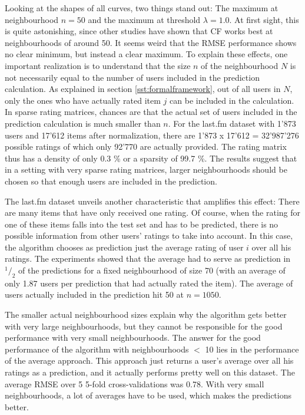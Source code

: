 Looking at the shapes of all curves, two things stand out: The maximum at neighbourhood $n=50$ and the maximum at threshold $\lambda = 1.0$. At first sight, this is quite astonishing, since other studies have shown that CF works best at neighbourhoods of around 50. It seems weird that the RMSE performance shows no clear minimum, but instead a clear maximum. To explain these effects, one important realization is to understand that the size $n$ of the neighbourhood $N$ is not necessarily equal to the number of users included in the prediction calculation. As explained in section \ref{sst:formalframework}, out of all users in $N$, only the ones who have actually rated item $j$ can be included in the calculation. In sparse rating matrices, chances are that the actual set of users included in the prediction calculation is much smaller than $n$. For the last.fm dataset with 1'873 users and 17'612 items after normalization, there are 1'873 x 17'612 = 32'987'276 possible ratings of which only 92'770 are actually provided. The rating matrix thus has a density of only 0.3 \% or a sparsity of 99.7 \%. The results suggest that in a setting with very sparse rating matrices, larger neighbourhoods should be chosen so that enough users are included in the prediction.

The last.fm dataset unveils another characteristic that amplifies this effect: There are many items that have only received one rating. Of course, when the rating for one of these items falls into the test set and has to be predicted, there is no possible information from other users' ratings to take into account. In this case, the algorithm chooses as prediction just the average rating of user $i$ over all his ratings. The experiments showed that the average had to serve as prediction in ${}^1/_2$ of the predictions for a fixed neighbourhood of size 70 (with an average of only 1.87 users per prediction that had actually rated the item). The average of users actually included in the prediction hit 50 at $n = 1050$.

The smaller actual neighbourhood sizes explain why the algorithm gets better with very large neighbourhoods, but they cannot be responsible for the good performance with very small neighbourhoods. The answer for the good performance of the algorithm with neighbourhoods $<$ 10 lies in the performance of the average approach. This approach just returns a user's average over all his ratings as a prediction, and it actually performs pretty well on this dataset. The average RMSE over 5 5-fold cross-validations was 0.78. With very small neighbourhoods, a lot of averages have to be used, which makes the predictions better.

